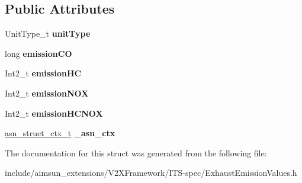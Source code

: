 \subsection*{Public Attributes}
\begin{DoxyCompactItemize}
\item 
Unit\+Type\+\_\+t {\bfseries unit\+Type}\hypertarget{structExhaustEmissionValues_a93ef9114506957da73bbc74b6d8b07c3}{}\label{structExhaustEmissionValues_a93ef9114506957da73bbc74b6d8b07c3}

\item 
long {\bfseries emission\+CO}\hypertarget{structExhaustEmissionValues_a4a1e5fad82ce8e16ab6c8cdee376f79d}{}\label{structExhaustEmissionValues_a4a1e5fad82ce8e16ab6c8cdee376f79d}

\item 
Int2\+\_\+t {\bfseries emission\+HC}\hypertarget{structExhaustEmissionValues_a1a950ff9cd2b91feca0aa8ecde052162}{}\label{structExhaustEmissionValues_a1a950ff9cd2b91feca0aa8ecde052162}

\item 
Int2\+\_\+t {\bfseries emission\+N\+OX}\hypertarget{structExhaustEmissionValues_a6fb53f9f3c82d0fac0f14bcb93c47e95}{}\label{structExhaustEmissionValues_a6fb53f9f3c82d0fac0f14bcb93c47e95}

\item 
Int2\+\_\+t {\bfseries emission\+H\+C\+N\+OX}\hypertarget{structExhaustEmissionValues_a30fc28340d3aa5e45948ac8dbbaacd97}{}\label{structExhaustEmissionValues_a30fc28340d3aa5e45948ac8dbbaacd97}

\item 
\hyperlink{structasn__struct__ctx__s}{asn\+\_\+struct\+\_\+ctx\+\_\+t} {\bfseries \+\_\+asn\+\_\+ctx}\hypertarget{structExhaustEmissionValues_afcb1ea711ccfbd4f910049e77dbf2338}{}\label{structExhaustEmissionValues_afcb1ea711ccfbd4f910049e77dbf2338}

\end{DoxyCompactItemize}


The documentation for this struct was generated from the following file\+:\begin{DoxyCompactItemize}
\item 
include/aimsun\+\_\+extensions/\+V2\+X\+Framework/\+I\+T\+S-\/spec/Exhaust\+Emission\+Values.\+h\end{DoxyCompactItemize}
